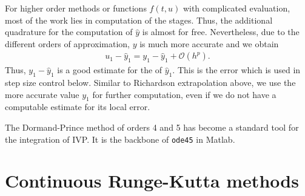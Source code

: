 \begin{remark}
  For higher order methods or functions $f(t,u)$ with complicated
  evaluation, most of the work lies in computation of the
  stages. Thus, the additional quadrature for the computation of $\hat
  y$ is almost for free. Nevertheless, due to the different orders of
  approximation, $y$ is much more accurate and we obtain
  \begin{gather}
    \label{eq:explicit:29}
    u_1 - \hat y_1 = y_1 - \hat y_1 + \mathcal O(h^p).
  \end{gather}
  Thus, $y_1 - \hat y_1$ is a good estimate for the  of $\hat y_1$. This is the error which is used in step size
  control below. Similar to Richardson extrapolation above, we use the
  more accurate value $y_1$ for further computation, even if we do not
  have a computable estimate for its local error.
\end{remark}



\begin{remark}
  The Dormand-Prince method of orders 4 and 5 has become a standard
  tool for the integration of IVP. It is the backbone of
  \texttt{ode45} in Matlab.
\end{remark}

\section{Continuous Runge-Kutta methods}

